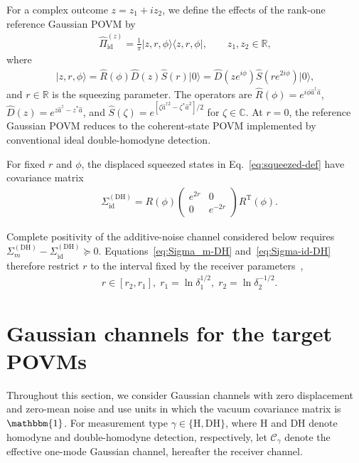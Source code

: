 \documentclass[%
final, 
superscriptaddress,
 amsmath,amssymb,amsfonts,
 aps,
 pra,
 longbibliography,
]{revtex4-2}
\newcommand{\ket}[1]{\ensuremath{|{#1}\rangle}}
\newcommand{\bra}[1]{\ensuremath{\langle{#1}|}}
\newcommand{\tcnj}[1]{{#1}^{\mathrm{T}}}
\newcommand{\ind}[1]{\mathrm{#1}}
\begin{document}
For a complex outcome $z=z_1+iz_2$, we define the effects of the rank-one reference Gaussian POVM by
\begin{align}
  \hat\Pi_{\ind{id}}^{(z)}
  =\frac{1}{\pi}\ket{z,r,\phi}\bra{z,r,\phi},
  \qquad z_1,z_2\in\mathbb{R},
\end{align}
where
\begin{align}
  \label{eq:squeezed-def}
  \ket{z,r,\phi}=\hat{R}(\phi)\hat{D}(z)\hat{S}(r)\ket{0}=
  \hat{D}(z e^{i\phi})\hat{S}(r e ^{2i\phi})\ket{0},
\end{align}
and $r\in\mathbb{R}$ is the squeezing parameter. The operators are $\hat R(\phi)=e^{i\phi\hat a^\dagger\hat a}$, $\hat D(z)=e^{z\hat a^\dagger-z^*\hat a}$, and $\hat S(\zeta)=e^{[\zeta\hat a^{\dagger2}-\zeta^*\hat a^2]/2}$ for $\zeta\in\mathbb{C}$. At $r=0$, the reference Gaussian POVM reduces to the coherent-state POVM implemented by conventional ideal double-homodyne detection.

For fixed $r$ and $\phi$, the displaced squeezed states in Eq.~\eqref{eq:squeezed-def} have covariance matrix
\begin{align}
  \label{eq:Sigma-id-DH}
  &
  \Sigma_{\ind{id}}^{(\ind{DH})}=
    R(\phi)
    \begin{pmatrix}
      e^{2r}&0\\0&e^{-2r}
    \end{pmatrix}
    \tcnj{R}(\phi).
\end{align}

Complete positivity of the additive-noise channel considered below requires $\Sigma_m^{(\ind{DH})}-\Sigma_{\ind{id}}^{(\ind{DH})}\succeq0$. Equations~\eqref{eq:Sigma_m-DH} and~\eqref{eq:Sigma-id-DH} therefore restrict $r$ to the interval fixed by the receiver parameters~\cite{naumchik2025asymmetryeffectshomodyneheterodyne},
\begin{align}
  \label{eq:r1-r2}
  &
    r\in \left[r_2,r_1\right],\;
    r_1=\ln\delta_1^{1/2},
    \;
    r_2=\ln\delta_2^{-1/2}.
\end{align}

\section{Gaussian channels for the target POVMs}
\label{sec:channels}

Throughout this section, we consider Gaussian channels with zero displacement and zero-mean noise and use units in which the vacuum covariance matrix is $\mathbbm{1}$. For measurement type $\gamma\in\{\ind{H},\ind{DH}\}$, where $\ind{H}$ and $\ind{DH}$ denote homodyne and double-homodyne detection, respectively, let $\mathcal{C}_{\gamma}$ denote the effective one-mode Gaussian channel, hereafter the receiver channel.
\end{document}
